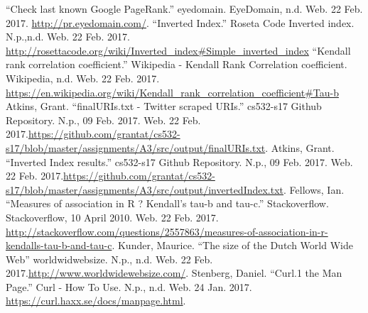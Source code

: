 \documentclass[letterpaper,11pt]{article}
\begin{document}
\clearpage

\begin{thebibliography}{9}
``Check last known Google PageRank.'' eyedomain. EyeDomain, n.d. Web. 22 Feb. 2017. \url{http://pr.eyedomain.com/}.
``Inverted Index.'' Roseta Code Inverted index. N.p.,n.d. Web. 22 Feb. 2017. \url{http://rosettacode.org/wiki/Inverted_index#Simple_inverted_index}
``Kendall rank correlation coefficient.'' Wikipedia - Kendall Rank Correlation coefficient. Wikipedia, n.d. Web. 22 Feb. 2017. \url{https://en.wikipedia.org/wiki/Kendall_rank_correlation_coefficient#Tau-b}
Atkins, Grant. ``finalURIs.txt - Twitter scraped URIs.'' cs532-s17 Github Repository. N.p., 09 Feb. 2017. Web. 22 Feb. 2017.\url{https://github.com/grantat/cs532-s17/blob/master/assignments/A3/src/output/finalURIs.txt}.
Atkins, Grant. ``Inverted Index results.'' cs532-s17 Github Repository. N.p., 09 Feb. 2017. Web. 22 Feb. 2017.\url{https://github.com/grantat/cs532-s17/blob/master/assignments/A3/src/output/invertedIndex.txt}.
Fellows, Ian. ``Measures of association in R ? Kendall's tau-b and tau-c.'' Stackoverflow. Stackoverflow, 10 April 2010. Web. 22 Feb. 2017. \url{http://stackoverflow.com/questions/2557863/measures-of-association-in-r-kendalls-tau-b-and-tau-c}.
Kunder, Maurice. ``The size of the Dutch World Wide Web'' worldwidwebsize. N.p., n.d. Web. 22 Feb. 2017.\url{http://www.worldwidewebsize.com/}.
Stenberg, Daniel. ``Curl.1 the Man Page.'' Curl - How To Use. N.p., n.d. Web. 24 Jan. 2017. \url{https://curl.haxx.se/docs/manpage.html}.
\end{thebibliography}
\end{document}

